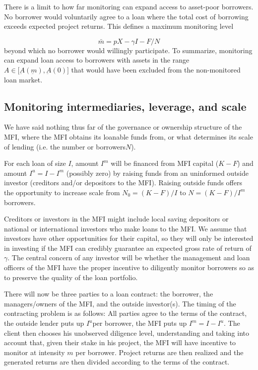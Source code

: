 \documentclass[letterpaper, 12pt]{article}
\begin{document}
There is a limit to how far monitoring can expand access to asset-poor
borrowers. No borrower would voluntarily agree to a loan where the total cost of borrowing exceeds expected project returns. This defines a maximum monitoring level

\begin{equation}
  \bar m = pX-\gamma I - F/N
\end{equation}
beyond which no borrower would willingly participate\(.\) To summarize,
monitoring can expand loan access to borrowers with assets in the range
\(A \in \lbrack\underbar A(\underbar m), \underbar A(0) \rbrack\) that would have been excluded from the non-monitored loan market.


\subsection{Monitoring intermediaries, leverage, and scale}\label{delegated-monitoring-leveraged-intermediation-and-scale}

We have said nothing thus far of the governance or ownership structure of the MFI, where the MFI obtains its loanable funds from, or what determines its scale of lending (i.e. the number or borrowers\(N\)).

For each loan of size \(I\), amount \(I^{m}\) will be financed from MFI
capital (\(K - F\)) and amount \(I^{u} = I - I^{m}\) (possibly zero) by
raising funds from an uninformed outside investor (creditors and/or
depositors to the MFI). Raising outside funds offers the opportunity to
increase scale from \(N_{0} = (K - F)/I\) to \(N = (K - F)/I^{m}\)
borrowers.

Creditors or investors in the MFI might include local saving depositors
or national or international investors who make loans to the MFI. We
assume that investors have other opportunities for their capital, so
they will only be interested in investing if the MFI can credibly
guarantee an expected gross rate of return of \(\gamma\). The central
concern of any investor will be whether the management and loan officers
of the MFI have the proper incentive to diligently monitor borrowers so
as to preserve the quality of the loan portfolio.

There will now be three parties to a loan contract: the borrower, the
managers/owners of the MFI, and the outside investor(s). The timing of
the contracting problem is as follows: All parties agree to the terms of
the contract, the outside lender puts up \(I^{u}\)per borrower, the MFI
puts up \(I^{m} = I - I^{u}.\) The client then chooses his unobserved
diligence level, understanding and taking into account that, given their
stake in his project, the MFI will have incentive to monitor at
intensity \(m\) per borrower. Project returns are then realized and the
generated returns are then divided according to the terms of the
contract.
\end{document}

